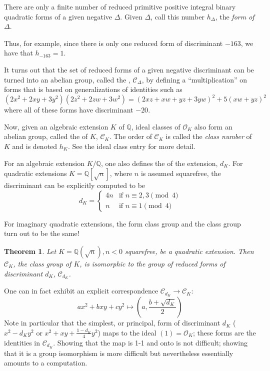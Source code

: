 \documentclass[12pt]{article}
\newcommand{\Rats}{\mathbb{Q}}
\newcommand{\Alg}{\mathcal{O}}
\newtheorem{thm}{Theorem}
\theoremstyle{definition}
\begin{document}
There are only a finite number of reduced primitive positive integral binary quadratic forms of a given negative  $\Delta$. Given $\Delta$, call this number $h_{\Delta}$, the \emph{form  of $\Delta$}.

Thus, for example, since there is only one reduced form of discriminant $-163$, we have that $h_{-163}=1$.

It turns out that the set of reduced forms of a given negative discriminant can be turned into an abelian group, called the \emph{}, $\mathcal{C}_{\Delta}$, by defining a ``multiplication'' on forms that is based on generalizations of identities such as
\[(2x^2+2xy+3y^2)(2z^2+2zw+3w^2)=(2xz+xw+yz+3yw)^2+5(xw+yz)^2\]
where all of these forms have discriminant $-20$.

Now, given an algebraic extension $K$ of $\Rats$, ideal classes of $\Alg_K$ also form an abelian group, called the \emph{} of $K$, $\mathcal{C}_K$. The order of $\mathcal{C}_K$ is called the \emph{class number} of $K$ and is denoted $h_K$. See the ideal class entry for more detail.

For an algebraic extension $K/\Rats$, one also defines the  of the extension, $d_K$. For quadratic extensions $K=\Rats[\sqrt{n}]$, where $n$ is assumed squarefree, the discriminant can be explicitly computed to be
\[
d_K=\begin{cases} 4n& \text{if }n\equiv 2,3\pmod 4\\
n& \text{if }n\equiv 1\pmod 4
\end{cases}
\]

For imaginary quadratic extensions, the form class group and the class group turn out to be the same!

\begin{thm} \label{thm:one}Let $K=\Rats(\sqrt{n}), n<0$ squarefree, be a quadratic extension. Then $\mathcal{C}_K$, the class group of $K$, is isomorphic to the group of reduced forms of discriminant $d_K$, $\mathcal{C}_{d_K}$.
\end{thm}

One can in fact exhibit an explicit correspondence $\mathcal{C}_{d_K}\to \mathcal{C}_K$:
\[ax^2+bxy+cy^2\mapsto(a,\frac{b+\sqrt{d_K}}{2})\]
Note in particular that the simplest, or principal, form of discriminant $d_K$ ($x^2-d_Ky^2$ or $x^2+xy+\frac{1-d_K}{4}y^2$) maps to the ideal $(1)=\Alg_K$; these forms are the identities in $\mathcal{C}_{d_K}$. Showing that the map is 1-1 and onto is not difficult; showing that it is a group isomorphism is more difficult but nevertheless essentially amounts to a computation.
\end{document}
